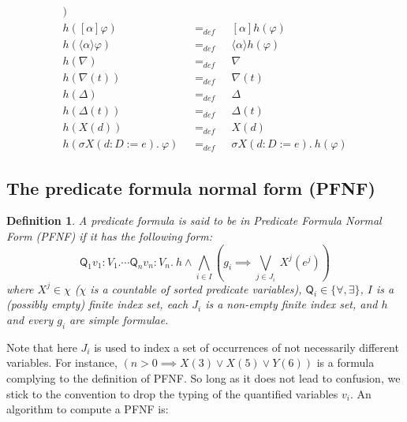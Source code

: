 \documentclass{article}
\newtheorem{definition}[theorem]{Definition}
\begin{document}
\begin{equation*}
\begin{array}{lll}
) \\ 
h([\alpha ]\varphi ) & =_{def} & [\alpha ]h(\varphi ) \\ 
h(\langle \alpha \rangle \varphi ) & =_{def} & \langle \alpha \rangle
h(\varphi ) \\ 
h(\nabla ) & =_{def} & \nabla \\ 
h(\nabla (t)) & =_{def} & \nabla (t) \\ 
h(\Delta ) & =_{def} & \Delta \\ 
h(\Delta (t)) & =_{def} & \Delta (t) \\ 
h(X(d)) & =_{def} & X(d) \\ 
h(\sigma X(d{:}D:=e).~\varphi )~~~ & =_{def}~~~ & \sigma X(d{:}%
D:=e).~h(\varphi )%
\end{array}%
\end{equation*}%
\pagebreak

\subsection{The predicate formula normal form (PFNF)}

\begin{definition}
A predicate formula is said to be in \emph{Predicate Formula Normal Form}
(PFNF) if it has the following form: 
\begin{equation*}
\mathsf{Q}_{1}v_{1}{:}V_{1}.\cdots \mathsf{Q}_{n}v_{n}{:}V_{n}.~h\wedge
\bigwedge\limits_{i\in I}\left( g_{i}\implies \bigvee\limits_{j\in
J_{i}}~X^{j}(e^{j})\right)
\end{equation*}%
where $X^{j}\in \chi $ ($\chi $ is a countable of sorted predicate
variables), $\mathsf{Q}_{i}\in \{\forall ,\exists \}$, $I$ is a (possibly
empty) finite index set, each $J_{i}$ is a non-empty finite index set, and $%
h $ and every $g_{i}$ are simple formulae.
\end{definition}

Note that here $J_{i}$ is used to index a set of occurrences of not
necessarily different variables. For instance, $(n>0\implies X(3)\vee
X(5)\vee Y(6))$ is a formula complying to the definition of PFNF. So long as
it does not lead to confusion, we stick to the convention to drop the typing
of the quantified variables $v_{i}$. An algorithm to compute a PFNF is:
\end{document}
